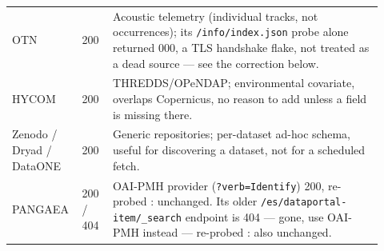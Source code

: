 \begin{wtable}
\begin{tabular}{p{0.14\linewidth}p{0.08\linewidth}p{0.70\linewidth}}
OTN & 200 & Acoustic telemetry (individual tracks, not occurrences); its \texttt{/info/index.json} probe alone returned 000, a TLS handshake flake, not treated as a dead source --- see the correction below. \\
HYCOM & 200 & THREDDS/OPeNDAP; environmental covariate, overlaps Copernicus, no reason to add unless a field is missing there. \\
Zenodo / Dryad / DataONE & 200 & Generic repositories; per-dataset ad-hoc schema, useful for discovering a dataset, not for a scheduled fetch. \\
PANGAEA & 200 / 404 & OAI-PMH provider (\texttt{?verb=Identify}) 200, re-probed \AsOf{}: unchanged. Its older \texttt{/es/dataportal-item/\_search} endpoint is 404 --- gone, use OAI-PMH instead --- re-probed \AsOf{}: also unchanged. \\
\bottomrule
\end{tabular}
\end{wtable}

